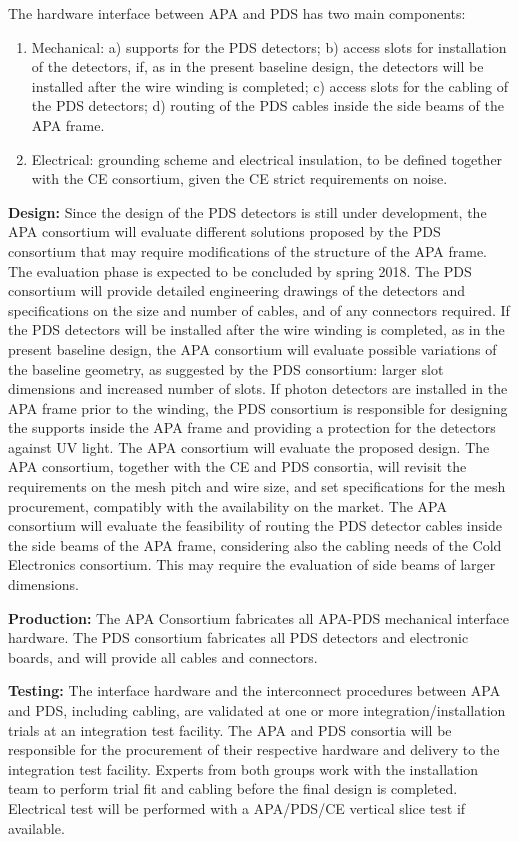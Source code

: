 The hardware interface between APA and PDS has two main components:
\begin{enumerate}
\item Mechanical: a) supports for the PDS detectors; b) access slots for installation of the detectors, if, as in the present baseline design, the detectors will be installed after the wire winding is completed; c) access slots for the cabling of the PDS detectors; d) routing of the PDS cables inside the side beams of the APA frame.
\item Electrical: grounding scheme and electrical insulation, to be defined together with the CE consortium, given the CE strict requirements on noise.
\end{enumerate}

\textbf{Design:}
Since the design of the PDS detectors is still under development, the APA consortium will evaluate different solutions proposed by the PDS consortium that may require modifications of the structure of the APA frame. The evaluation phase is expected to be concluded by spring 2018. The PDS consortium will provide detailed engineering drawings of the detectors and specifications on the size and number of cables, and of any connectors required. 
If the PDS detectors will be installed after the wire winding is completed, as in the present baseline design, the APA consortium will evaluate possible variations of the baseline geometry, as suggested by the PDS consortium: larger slot dimensions and increased number of slots.
If photon detectors are installed in the APA frame prior to the winding, the PDS consortium is responsible for designing the supports inside the APA frame and providing a protection for the detectors against UV light. The APA consortium will evaluate the proposed design.
The APA consortium, together with the CE and PDS consortia, will revisit the requirements on the mesh pitch and wire size, and set specifications for the mesh procurement, compatibly with the availability on the market.
The APA consortium will evaluate the feasibility of routing the PDS detector cables inside the side beams of the APA frame, considering also the cabling needs of the Cold Electronics consortium. This may require the evaluation of side beams of larger dimensions.

\textbf{Production:}
The APA Consortium fabricates all APA-PDS mechanical interface hardware.
The PDS consortium fabricates all PDS detectors and electronic boards, and will provide all cables and connectors.

\textbf{Testing:}
The interface hardware and the interconnect procedures between APA and PDS, including cabling, are validated at one or more integration/installation trials at an integration test facility. The APA and PDS consortia will be responsible for the procurement of their respective hardware and delivery to the integration test facility. Experts from both groups work with the installation team to perform trial fit and cabling before the final design is completed.  Electrical test will be performed with a APA/PDS/CE vertical slice test if available.


